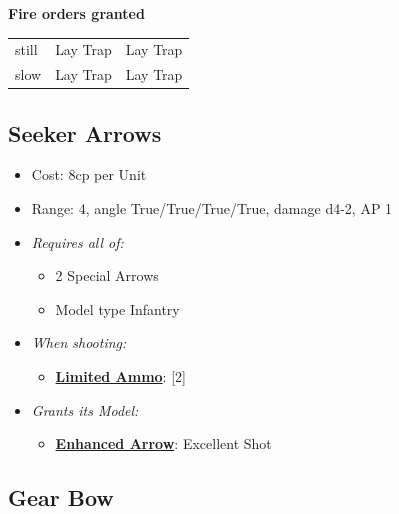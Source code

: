 \documentclass[a4paper,12pt]{article}
\begin{document}
\noindent\textbf{Fire orders granted}

\begin{tabular}{lll}
still & Lay Trap & Lay Trap \\
slow & Lay Trap & Lay Trap \\
\end{tabular}
\vspace{1ex}

\subsection{Seeker Arrows}
\label{equipment-seeker-arrows}

\begin{itemize}
\item Cost: 8cp per Unit
\item Range: 4, angle True/True/True/True, damage d4-2, AP 1
\item \textit{Requires all of:}
\begin{itemize}
\item 2 Special Arrows
\item Model type Infantry
\end{itemize}
\item \textit{When shooting:}
\begin{itemize}
\item \textbf{\hyperref[rule-special-limited-ammo]{Limited Ammo}}: [2]

\end{itemize}





\item \textit{Grants its Model:}
\begin{itemize}
\item \textbf{\hyperref[rule-special-to-hit]{Enhanced Arrow}}: Excellent Shot

\end{itemize}

\end{itemize}

\subsection{Gear Bow}
\label{equipment-gear-bow}
\end{document}
